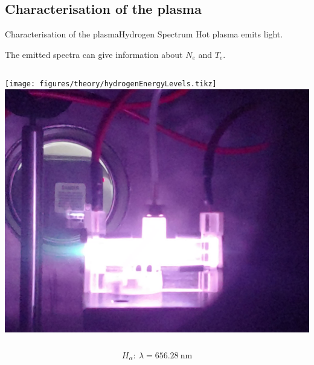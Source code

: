 \documentclass[dvipsnames]{beamer}
\begin{document}
\subsection[]{Characterisation of the plasma}
\begin{frame}{Characterisation of the plasma}{Hydrogen Spectrum}
Hot plasma emits light.

The emitted spectra can give information about $N_e$ and $T_e$.
\begin{columns}
 \texttt{[image: figures/theory/hydrogenEnergyLevels.tikz]}
 \includegraphics[width=\textwidth]{figures/theory/purple_plasma.png}
\end{columns}
$$H_{\alpha}:\ \lambda=\SI{656.28}{\nm}
$$
\end{frame}
% 
\end{document}

